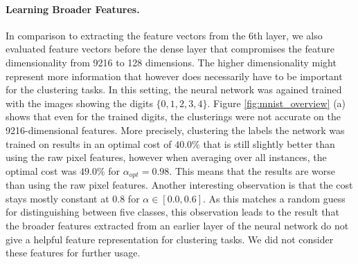 \paragraph{Learning Broader Features.} In comparison to extracting the feature vectors from the 6th layer, we also evaluated feature vectors before the dense layer that compromises the feature dimensionality from 9216 to 128 dimensions. The higher dimensionality might represent more information that however does necessarily have to be important for the clustering tasks. In this setting, the neural network was agained trained with the images showing the digits $\{0,1,2,3,4\}$. Figure \ref{fig:mnist_overview} (a) shows that even for the trained digits, the clusterings were not accurate on the 9216-dimensional features. More precisely, clustering the labels the network was trained on results in an optimal cost of $40.0\%$ that is still slightly better than using the raw pixel features, however when averaging over all instances, the optimal cost was $49.0\%$ for $\alpha_{opt} = 0.98$. This means that the results are worse than using the raw pixel features. Another interesting observation is that the cost stays mostly constant at $0.8$ for $\alpha \in [0.0,0.6]$. As this matches a random guess for distinguishing between five classes, this observation leads to the result that the broader features extracted from an earlier layer of the neural network do not give a helpful feature representation for clustering tasks. We did not consider these features for further usage.

